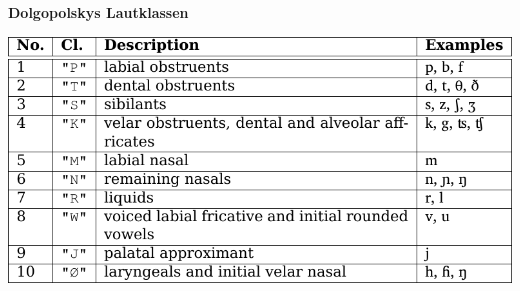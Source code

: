 \vspace{0.5cm}\par\noindent\textbf{Dolgopolskys Lautklassen}\vspace{0.5cm}

\includegraphics[width=\textwidth]{img/dolgopolsky.pdf}

